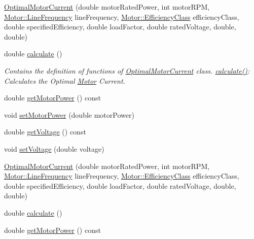 \begin{DoxyCompactItemize}
\item 
\hyperlink{class_optimal_motor_current_a6e88ae5d7005b9790810de4f8892ba15}{Optimal\+Motor\+Current} (double motor\+Rated\+Power, int motor\+R\+PM, \hyperlink{class_motor_acee1bdf1b684ad36cb80dc2829d9fcee}{Motor\+::\+Line\+Frequency} line\+Frequency, \hyperlink{class_motor_afa022971ae062406a9f588c601673d4e}{Motor\+::\+Efficiency\+Class} efficiency\+Class, double specified\+Efficiency, double load\+Factor, double rated\+Voltage, double, double)
\item 
double \hyperlink{class_optimal_motor_current_af2dcf21026f526901ccf2927affecd49}{calculate} ()
\begin{DoxyCompactList}\small\item\em Contains the definition of functions of \hyperlink{class_optimal_motor_current}{Optimal\+Motor\+Current} class. \hyperlink{class_optimal_motor_current_af2dcf21026f526901ccf2927affecd49}{calculate()}\+: Calculates the Optimal \hyperlink{class_motor}{Motor} Current. \end{DoxyCompactList}\item 
double \hyperlink{class_optimal_motor_current_a345ae983be872a2504c50ff8a96b4fc9}{get\+Motor\+Power} () const
\item 
void \hyperlink{class_optimal_motor_current_a4950fe2e789f5c150648a846898aff74}{set\+Motor\+Power} (double motor\+Power)
\item 
double \hyperlink{class_optimal_motor_current_a4f9b5f8b83287868a72bfeca97713fd3}{get\+Voltage} () const
\item 
void \hyperlink{class_optimal_motor_current_a71dd261541b67b551e7053d3d6a35f6d}{set\+Voltage} (double voltage)
\item 
\hyperlink{class_optimal_motor_current_a6e88ae5d7005b9790810de4f8892ba15}{Optimal\+Motor\+Current} (double motor\+Rated\+Power, int motor\+R\+PM, \hyperlink{class_motor_acee1bdf1b684ad36cb80dc2829d9fcee}{Motor\+::\+Line\+Frequency} line\+Frequency, \hyperlink{class_motor_afa022971ae062406a9f588c601673d4e}{Motor\+::\+Efficiency\+Class} efficiency\+Class, double specified\+Efficiency, double load\+Factor, double rated\+Voltage, double, double)
\item 
double \hyperlink{class_optimal_motor_current_af2dcf21026f526901ccf2927affecd49}{calculate} ()
\item 
double \hyperlink{class_optimal_motor_current_a345ae983be872a2504c50ff8a96b4fc9}{get\+Motor\+Power} () const
\item 

\end{DoxyCompactItemize}
